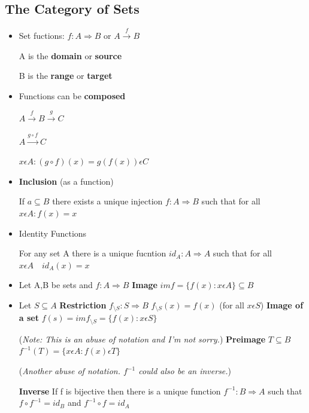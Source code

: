 \documentclass{article}
\begin{document}
\subsection{The Category of Sets}
\begin{itemize}
\item Set fuctions: $f: A \Rightarrow B$ or $A \xrightarrow{f}B$

A is the \textbf{domain} or \textbf{source}

B is the \textbf{range} or \textbf{target}

\item Functions can be \textbf{composed}

$A \xrightarrow{f}B\xrightarrow{g}C$

$A \xrightarrow{g\circ f}C$

$x \epsilon A: (g \circ f)(x) = g(f(x)) \epsilon C$

\item \textbf{Inclusion} (as a function)

If $a \subseteq B$ there exists a unique injection $f: A \Rightarrow B$ such that for all $x \epsilon A: f(x) = x$

\item Identity Functions

For any set A there is a unique fucntion $id_A: A \Rightarrow A$ such that for all $x\epsilon A \quad id_A(x) = x$

\item Let A,B be sets and $f: A \Rightarrow B$
\subitem \textbf{Image}
 $im f = \{f(x): x \epsilon A\} \subseteq B$
 \item Let $S \subseteq A$
 \subitem \textbf{Restriction}
 $f_{\setminus S}: S\Rightarrow B$
 $f_{\setminus S}(x) = f(x)$ (for all $x \epsilon S$)
 \subitem \textbf{Image of a set}
 $f(s) = imf_{\setminus S} = \{f(x): x\epsilon S\}$
 
 (\textit{Note: This is an abuse of notation and I'm not sorry.})
 \subitem \textbf{Preimage}
 $ T \subseteq B$
 $f^{-1}(T) = \{x \epsilon A: f(x) \epsilon T \}$ 
 
 (\textit{Another abuse of notation. $f^{-1}$ could also be an inverse.})
 
 \subitem \textbf{Inverse}
 If f is bijective then there is a unique function $f^{-1}: B \Rightarrow A$ such that $ f\circ f^{-1} = id_B$ and $f^{-1} \circ f = id_A$
\end{itemize}
\end{document}
